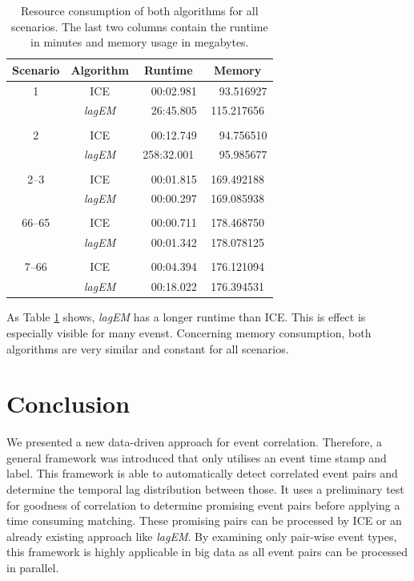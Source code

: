 \documentclass[conference]{IEEEtran}
\theoremstyle{examplestyle}
\begin{document}
\begin{table}[!htb]
	\centering
	\begin{tabular}{c c c c}
		\textbf{Scenario} & \textbf{Algorithm} & \textbf{Runtime} & \textbf{Memory} \\
		\hline
		1	& \ac{ICE}				&	~~00:02.981	&	~~93.516927	\\
			& \textit{lagEM}		&	~~26:45.805	&	115.217656	\\
		\\
		2	& \ac{ICE}				&	~~00:12.749	&	~~94.756510	\\
			& \textit{lagEM}		&	258:32.001	&	~~95.985677	\\
		\\
		2--3 & \ac{ICE}				&	~~00:01.815	&	169.492188 \\
			&	\textit{lagEM}		&	~~00:00.297	&	169.085938 \\
		\\
		66--65 & \ac{ICE}			&	~~00:00.711	&	178.468750 \\
			&	\textit{lagEM}		&	~~00:01.342	&	178.078125 \\
		\\
		7--66 & \ac{ICE}			&	~~00:04.394	&	176.121094 \\
			&	\textit{lagEM}		&	~~00:18.022	&	176.394531 \\
	\end{tabular}
	\caption{Resource consumption of both algorithms for all scenarios. The last two columns contain the runtime in minutes and memory usage in megabytes.}
	\label{tbl:resources}
\end{table}



As Table \ref{tbl:resources} shows, \textit{lagEM} has a longer runtime than \ac{ICE}. This is effect is especially visible for many evenst. Concerning memory consumption, both algorithms are very similar and constant for all scenarios.



\section{Conclusion} \label{sec:conc}
We presented a new data-driven approach for event correlation. Therefore, a general framework was introduced that only utilises an event time stamp and label. This framework is able to automatically detect correlated event pairs and determine the temporal lag distribution between those. It uses a preliminary test for goodness of correlation to determine promising event pairs before applying a time consuming matching. These promising pairs can be processed by \ac{ICE} or an already existing approach like \textit{lagEM}. By examining only pair-wise event types, this framework is highly applicable in big data as all event pairs can be processed in parallel.
\end{document}
